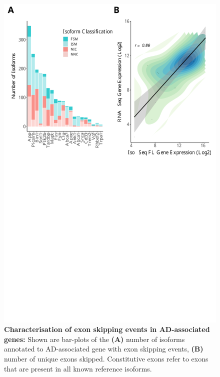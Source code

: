 \begin{figure}[]
	\centering
	\includegraphics[page=6,trim={0 20cm 0 0cm},clip,scale = 0.55]{Figures/ONTvsIsoSeq.pdf}
	\captionsetup{width=0.95\textwidth}
	\caption[Characterisation of exon skipping events in AD-associated genes]%
	{\textbf{Characterisation of exon skipping events in AD-associated genes:} Shown are bar-plots of the \textbf{(A)} number of isoforms annotated to AD-associated gene with exon skipping events, \textbf{(B)} number of unique exons skipped. Constitutive exons refer to exons that are present in all known reference isoforms.}
	\label{fig:ES_targeted}
\end{figure}

